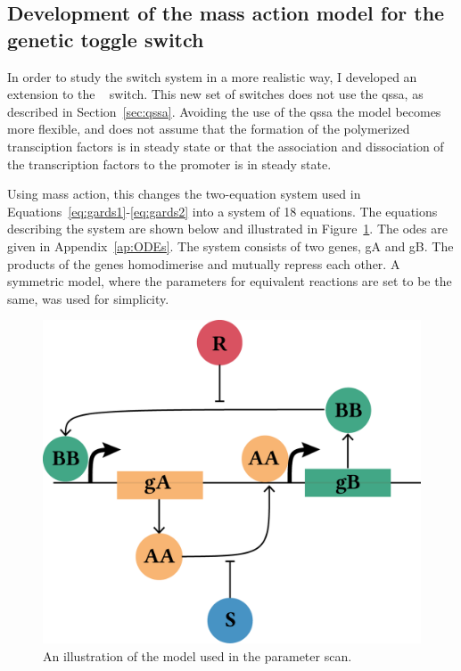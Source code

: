 \subsection{Development of the mass action model for the genetic toggle switch}

In order to study the switch system in a more realistic way, I developed an extension to the ~\textcite{Gardner:2000vha} switch. This new set of switches does not use the \acrfull{qssa}, as described in Section~\ref{sec:qssa}. Avoiding the use of the \acrshort{qssa} the model becomes more flexible, and does not assume that the formation of the polymerized transciption factors is in steady state or that the association and dissociation of the transcription factors to the promoter is in steady state.  

Using mass action, this changes the two-equation system used in Equations~\ref{eq:gards1}-\ref{eq:gards2} into a system of 18 equations. The equations describing the system are shown below and illustrated in Figure~\ref{fig:Gard_MA}. The \acrshort{ode}s are given in Appendix~\ref{ap:ODEs}. The system consists of two genes, gA and gB. The products of the genes homodimerise and mutually repress each other. A symmetric model, where the parameters for equivalent reactions are set to be the same, was used for simplicity.

\begin{figure}[tb]
	\begin{center}
\includegraphics[scale=0.6]{../../chapters/chapterABCSysBio/images/ma-switch-diagram.png}
\caption[Toggle switch model used in the parameter scan]{\label{fig:Gard_MA}An illustration of the model used in the parameter scan. }
\end{center}
\end{figure}



